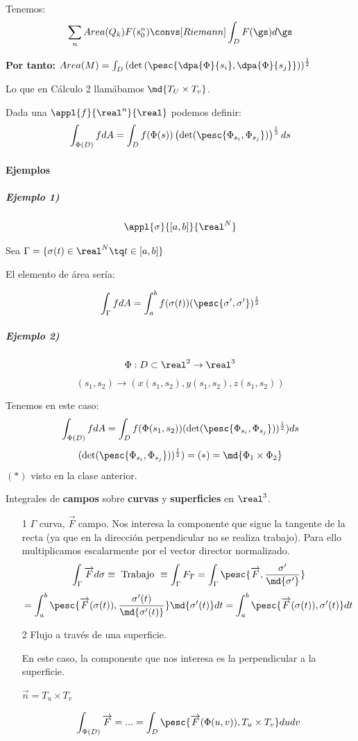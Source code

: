 Tenemos: \[\sum_n Area(Q_k) F(s_0^n) \convs[Riemann] \int_D F(\gs)d\gs\]

\textbf{Por tanto:} $Area(M) = \int_D \left(\det\left(\pesc{\dpa{\Phi}{s_i},\dpa{\Phi}{s_j}}\right)\right)^{\frac{1}{2}}$

Lo que en Cálculo 2 llamábamos $\md{T_U\times T_v}$.


Dada una $\appl{f}{\real^n}{\real}$ podemos definir: \[\int_{\Phi(D)}f dA = \int_{D}f(\Phi(s)) \left(\det(\pesc{\Phi_{s_i},\Phi_{s_j}})\right)^{\frac{1}{2}} ds\]

\paragraph{Ejemplos}

\subparagraph{Ejemplo 1)}

\[\appl{\sigma}{[a,b]}{\real^N}\]

Sea $\Gamma = \{\sigma(t)\in\real^N\tq t\in[a,b]\}$

El elemento de área sería:

\[\int_{\Gamma} fdA = \int_a^bf(\sigma(t)) (\pesc{\sigma',\sigma'})^{\frac{1}{2}}\]


\subparagraph{Ejemplo 2)}

\[
\Phi : D\subset\real^2\rightarrow \real^3\]
\[(s_1,s_2)\rightarrow (x(s_1,s_2),y(s_1,s_2),z(s_1,s_2))\]

Tenemos en este caso:
\[\int_{\Phi(D)}fdA = \int_D f(\Phi(s_1,s_2)) (\det(\pesc{\Phi_{s_i},\Phi_{s_j}}))^{\frac{1}{2}})ds\]
\[(\det(\pesc{\Phi_{s_i},\Phi_{s_j}}))^{\frac{1}{2}}) = (*) = \md{\Phi_1 \times \Phi_2}\]
$(*)$ visto en la clase anterior.

Integrales de \textbf{campos} sobre \textbf{curvas} y \textbf{superficies} en $\real^3$.

\begin{itemize}
\item[1] $\Gamma$ curva, $\overrightarrow{F}$ campo. Nos interesa la componente que sigue la tangente de la recta (ya que en la dirección perpendicular no se realiza trabajo). Para ello multiplicamos escalarmente por el vector director normalizado.
\[\int_{\Gamma} \overrightarrow{F}d\sigma \equiv \text{ Trabajo } \equiv \int_{\Gamma} F_T = \int_{\Gamma} \pesc{\overrightarrow{F},\frac{\sigma'}{\md{\sigma'}}}\]
\[ = \int_a^b \pesc{\overrightarrow{F}(\sigma(t)),\frac{\sigma'(t)}{\md{\sigma'(t)}}} \md{\sigma'(t)}dt = \int_a^b \pesc{\overrightarrow{F}(\sigma(t)),\sigma'(t)} dt\]

\item[2] Flujo a través de una superficie.

En este caso, la componente que nos interesa es la perpendicular a la superficie.

$\overrightarrow{n} = T_u\times T_v$

\[\int_{\Phi(D)} \overrightarrow{F} = ... = \int_{D} \pesc{\overrightarrow{F}(\Phi(u,v)),T_u\times T_v}dudv\]
\end{itemize}

